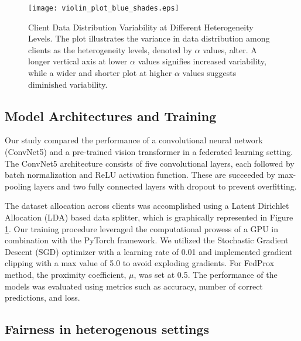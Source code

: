 \begin{figure}[htbp]
    \centering
    \texttt{[image: violin\_plot\_blue\_shades.eps]}
   \caption{Client Data Distribution Variability at Different Heterogeneity Levels. The plot illustrates the variance in data distribution among clients as the heterogeneity levels, denoted by $\alpha$ values, alter. A longer vertical axis at lower $\alpha$ values signifies increased variability, while a wider and shorter plot at higher $\alpha$ values suggests diminished variability.}
   \label{fig:data_distribution}
\end{figure}

\subsection{Model Architectures and Training} 

Our study compared the performance of a convolutional neural network (ConvNet5) and a pre-trained vision transformer in a federated learning setting. The ConvNet5 architecture consists of five convolutional layers, each followed by batch normalization and ReLU activation function. These are succeeded by max-pooling layers and two fully connected layers with dropout to prevent overfitting.

The dataset allocation across clients was accomplished using a Latent Dirichlet Allocation (LDA) based data splitter, which is graphically represented in Figure \ref{fig:data_distribution}. Our training procedure leveraged the computational prowess of a GPU in combination with the PyTorch framework. We utilized the Stochastic Gradient Descent (SGD) optimizer with a learning rate of 0.01 and implemented gradient clipping with a max value of 5.0 to avoid exploding gradients. For FedProx method, the proximity coefficient, $\mu$, was set at 0.5. The performance of the models was evaluated using metrics such as accuracy, number of correct predictions, and loss. 

\subsection{Fairness in heterogenous settings}

